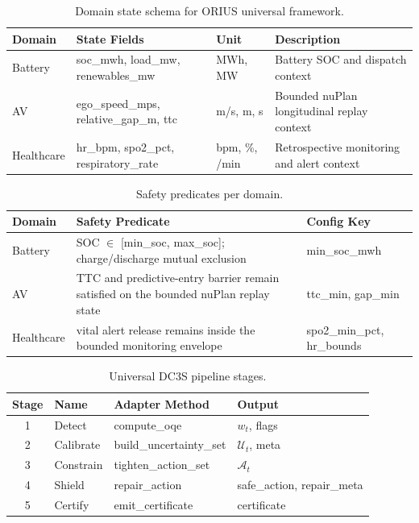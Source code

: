 
\begin{table}[t]
\centering
\caption{Domain state schema for ORIUS universal framework.}
\label{tab:universal-state}
\begin{tabularx}{\textwidth}{@{}lXlX@{}}
\toprule
\textbf{Domain} & \textbf{State Fields} & \textbf{Unit} & \textbf{Description} \\
\midrule
Battery & soc\_mwh, load\_mw, renewables\_mw & MWh, MW & Battery SOC and dispatch context \\
AV & ego\_speed\_mps, relative\_gap\_m, ttc & m/s, m, s & Bounded nuPlan longitudinal replay context \\
Healthcare & hr\_bpm, spo2\_pct, respiratory\_rate & bpm, \%, /min & Retrospective monitoring and alert context \\
\bottomrule
\end{tabularx}
\end{table}

\begin{table}[t]
\centering
\caption{Safety predicates per domain.}
\label{tab:universal-safety}
\begin{tabularx}{\textwidth}{@{}lXX@{}}
\toprule
\textbf{Domain} & \textbf{Safety Predicate} & \textbf{Config Key} \\
\midrule
Battery & SOC $\in$ [min\_soc, max\_soc]; charge/discharge mutual exclusion & min\_soc\_mwh \\
AV & TTC and predictive-entry barrier remain satisfied on the bounded nuPlan replay state & ttc\_min, gap\_min \\
Healthcare & vital alert release remains inside the bounded monitoring envelope & spo2\_min\_pct, hr\_bounds \\
\bottomrule
\end{tabularx}
\end{table}

\begin{table}[t]
\centering
\caption{Universal DC3S pipeline stages.}
\label{tab:universal-pipeline}
\begin{tabular}{clll}
\toprule
\textbf{Stage} & \textbf{Name} & \textbf{Adapter Method} & \textbf{Output} \\
\midrule
1 & Detect & compute\_oqe & $w_t$, flags \\
2 & Calibrate & build\_uncertainty\_set & $\mathcal{U}_t$, meta \\
3 & Constrain & tighten\_action\_set & $\mathcal{A}_t$ \\
4 & Shield & repair\_action & safe\_action, repair\_meta \\
5 & Certify & emit\_certificate & certificate \\
\bottomrule
\end{tabular}
\end{table}
